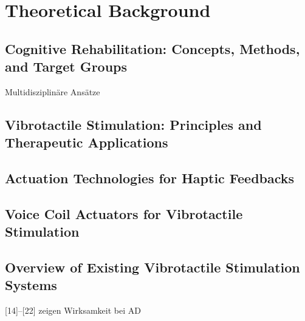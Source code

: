 \chapter[Theoretical Background]{Theoretical Background}

\section{Cognitive Rehabilitation: Concepts, Methods, and Target Groups}
Multidisziplinäre Ansätze
\cite{Zucchella.2018}

\cite{Campbell.2022}

\section{Vibrotactile Stimulation: Principles and Therapeutic Applications}
\cite{Campbell.2022}

\cite{ClementsCortes.2016, Heesterbeek.2019,Lam.2018, Clair.1993, Kim.2018, ClementsCortes.2017, Mercado.2006, ClementsCortes.2017b, ClementsCortes.2022}


\section{Actuation Technologies for Haptic Feedbacks}

\section{Voice Coil Actuators for Vibrotactile Stimulation}

\section{Overview of Existing Vibrotactile Stimulation Systems}


[14]–[22] zeigen Wirksamkeit bei AD

